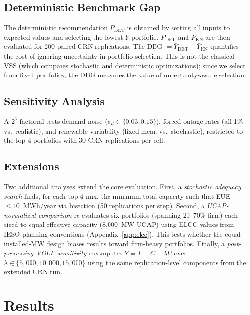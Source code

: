 \documentclass[11pt]{article}
\begin{document}
\subsection{Deterministic Benchmark Gap}

The deterministic recommendation $P_{\text{DET}}$ is obtained by setting all inputs to expected values and selecting the lowest-$Y$ portfolio. $P_{\text{DET}}$ and $P_{\text{KN}}$ are then evaluated for 200 paired CRN replications. The DBG $= \bar{Y}_{\text{DET}} - \bar{Y}_{\text{KN}}$ quantifies the cost of ignoring uncertainty in portfolio selection. This is not the classical VSS (which compares stochastic and deterministic optimizations); since we select from fixed portfolios, the DBG measures the value of uncertainty-aware selection.

\subsection{Sensitivity Analysis}

A $2^3$ factorial tests demand noise ($\sigma_d \in \{0.03, 0.15\}$), forced outage rates (all 1\% vs.\ realistic), and renewable variability (fixed mean vs.\ stochastic), restricted to the top-4 portfolios with 30 CRN replications per cell.

\subsection{Extensions}

Two additional analyses extend the core evaluation. First, a \textit{stochastic adequacy search} finds, for each top-4 mix, the minimum total capacity such that EUE $\leq 10$~MWh/year via bisection (50 replications per step). Second, a \textit{UCAP-normalized comparison} re-evaluates six portfolios (spanning 20--70\% firm) each sized to equal effective capacity (8,000~MW UCAP) using ELCC values from IESO planning conventions (Appendix~\ref{app:elcc}). This tests whether the equal-installed-MW design biases results toward firm-heavy portfolios. Finally, a \textit{post-processing VOLL sensitivity} recomputes $Y = F + C + \lambda U$ over $\lambda \in \{5{,}000, 10{,}000, 15{,}000\}$ using the same replication-level components from the extended CRN run.

\section{Results}\label{sec:results}
\end{document}
